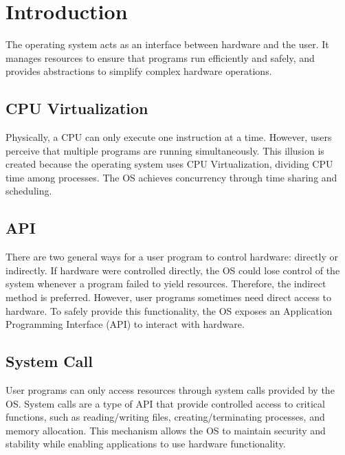 \section{Introduction}
The operating system acts as an interface between hardware and the user.
It manages resources to ensure that programs run efficiently and safely,
and provides abstractions to simplify complex hardware operations.

\subsection{CPU Virtualization}
Physically, a CPU can only execute one instruction at a time.
However, users perceive that multiple programs are running simultaneously.
This illusion is created because the operating system uses CPU Virtualization,
dividing CPU time among processes.
The OS achieves concurrency through time sharing and scheduling.

\subsection{API}
There are two general ways for a user program to control hardware: directly or indirectly.
If hardware were controlled directly, the OS could lose control of the system
whenever a program failed to yield resources.
Therefore, the indirect method is preferred.
However, user programs sometimes need direct access to hardware.
To safely provide this functionality, the OS exposes
an Application Programming Interface (API) to interact with hardware.

\subsection{System Call}
User programs can only access resources through system calls provided by the OS.
System calls are a type of API that provide controlled access to critical functions,
such as reading/writing files, creating/terminating processes, and memory allocation.
This mechanism allows the OS to maintain security and stability
while enabling applications to use hardware functionality.